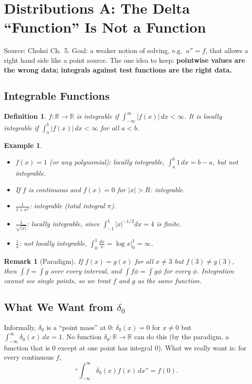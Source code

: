 \documentclass{article}
\newtheorem{definition}{Definition}
\newtheorem*{example}{Example}
\newtheorem{remark}{Remark}
\newcommand{\R}{\mathbb{R}}
\begin{document}
\section{Distributions A: The Delta ``Function'' Is Not a Function}\label{sec:distA}
Source: Choksi Ch.~5. Goal: a weaker notion of solving, e.g.\ $u'' = f$, that allows a right hand side like a point source. The one idea to keep: \textbf{pointwise values are the wrong data; integrals against test functions are the right data.}

\subsection{Integrable Functions}
\begin{definition}
    $f : \R \to \R$ is \emph{integrable} if $\int_{-\infty}^{\infty} |f(x)|\,dx < \infty$. It is \emph{locally integrable} if $\int_a^b |f(x)|\,dx < \infty$ for all $a < b$.
\end{definition}
\begin{example}
    \leavevmode
    \begin{itemize}
        \item $f(x) = 1$ (or any polynomial): locally integrable, $\int_a^b 1\,dx = b - a$, but not integrable.
        \item If $f$ is continuous and $f(x) = 0$ for $|x| > R$: integrable.
        \item $\frac{1}{1+x^2}$: integrable (total integral $\pi$).
        \item $\frac{1}{\sqrt{|x|}}$: locally integrable, since $\int_{-1}^1 |x|^{-1/2}dx = 4$ is finite.
        \item $\frac{1}{x}$: not locally integrable, $\int_0^1 \frac{dx}{x} = \log x\big|_0^1 = \infty$.
    \end{itemize}
\end{example}
\begin{remark}[Paradigm]
    If $f(x) = g(x)$ for all $x \neq 3$ but $f(3) \neq g(3)$, then $\int f = \int g$ over every interval, and $\int f\phi = \int g\phi$ for every $\phi$. Integration cannot see single points, so we treat $f$ and $g$ as the same function.
\end{remark}

\subsection{What We Want from $\delta_0$}
Informally, $\delta_0$ is a ``point mass'' at $0$: $\delta_0(x) = 0$ for $x \neq 0$ but $\int_{-\infty}^{\infty} \delta_0(x)\,dx = 1$. No function $\delta_0 : \R \to \R$ can do this (by the paradigm, a function that is $0$ except at one point has integral $0$). What we really want is: for every continuous $f$,
\begin{equation}
    \text{``}\int_{-\infty}^{\infty} \delta_0(x) f(x)\,dx\text{''} = f(0).
\end{equation}
\end{document}
